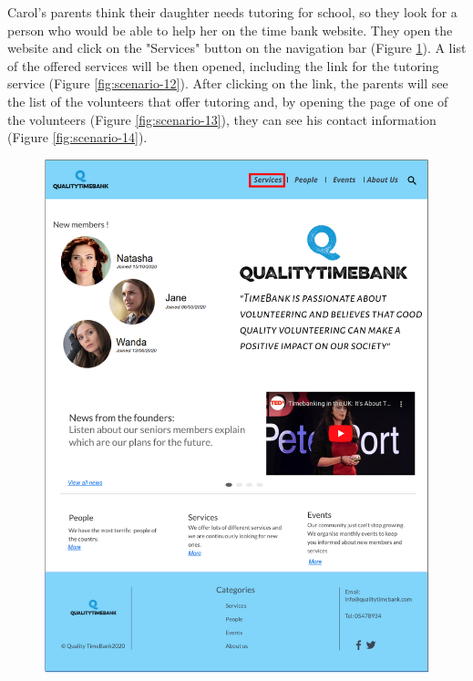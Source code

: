 \documentclass[a4paper, 11pt, parskip=half, headsepline]{scrreprt}
\begin{document}
Carol's parents think their daughter needs tutoring for school, so they look for a person who would be able to help her on the time bank website. They open the website and click on the "Services" button on the navigation bar (Figure \ref{fig:scenario-11}). A list of the offered services will be then opened, including the link for the tutoring service (Figure \ref{fig:scenario-12}). After clicking on the link, the parents will see the list of the volunteers that offer tutoring and, by opening the page of one of the volunteers (Figure \ref{fig:scenario-13}), they can see his contact information (Figure \ref{fig:scenario-14}).

\begin{figure}[H]
    \begin{minipage}[t]{0.5\textwidth}
        \centering
    	\includegraphics[width=1\linewidth, keepaspectratio]{scenarios/scenario-11}
    	\caption{}
    	\label{fig:scenario-11}
    \end{minipage}

\end{figure}
\end{document}
